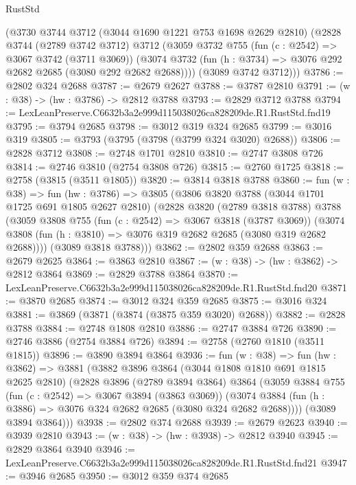 \begin{lexlean}{RustStd}
\begin{coremodule}
    (@3730
      @3744
      @3712
      (@3044 @1690 @1221 @753 @1698 @2629 @2810)
      (@2828
        @3744
        (@2789 @3742 @3712)
        @3712
        (@3059
          @3732
          @755
          (fun (c : @2542) => @3067 @3742 (@3711 @3069))
          (@3074 @3732 (fun (h : @3734) => @3076 @292 @2682 @2685 (@3080 @292 @2682 @2688))))
        (@3089 @3742 @3712)))
@3786 := @2802 @324 @2688
@3787 := @2679 @2627
@3788 := @3787 @2810
@3791 := (w : @38) -> (hw : @3786) -> @2812 @3788
@3793 := @2829 @3712 @3788
@3794 := LexLeanPreserve.C6632b3a2e999d115038026ca828209de.R1.RustStd.fnd19
@3795 := @3794 @2685
@3798 := @3012 @319 @324 @2685
@3799 := @3016 @319
@3805 := @3793 (@3795 (@3798 (@3799 @324 @3020) @2688))
@3806 := @2828 @3712
@3808 := @2748 @1701 @2810
@3810 := @2747 @3808 @726
@3814 := @2746 @3810 (@2754 @3808 @726)
@3815 := @2760 @1725
@3818 := @2758 (@3815 (@3511 @1805))
@3820 := @3814 @3818 @3788
@3860 := fun (w : @38) =>
  fun (hw : @3786) =>
  @3805
    (@3806
      @3820
      @3788
      (@3044 @1701 @1725 @691 @1805 @2627 @2810)
      (@2828
        @3820
        (@2789 @3818 @3788)
        @3788
        (@3059
          @3808
          @755
          (fun (c : @2542) => @3067 @3818 (@3787 @3069))
          (@3074 @3808 (fun (h : @3810) => @3076 @319 @2682 @2685 (@3080 @319 @2682 @2688))))
        (@3089 @3818 @3788)))
@3862 := @2802 @359 @2688
@3863 := @2679 @2625
@3864 := @3863 @2810
@3867 := (w : @38) -> (hw : @3862) -> @2812 @3864
@3869 := @2829 @3788 @3864
@3870 := LexLeanPreserve.C6632b3a2e999d115038026ca828209de.R1.RustStd.fnd20
@3871 := @3870 @2685
@3874 := @3012 @324 @359 @2685
@3875 := @3016 @324
@3881 := @3869 (@3871 (@3874 (@3875 @359 @3020) @2688))
@3882 := @2828 @3788
@3884 := @2748 @1808 @2810
@3886 := @2747 @3884 @726
@3890 := @2746 @3886 (@2754 @3884 @726)
@3894 := @2758 (@2760 @1810 (@3511 @1815))
@3896 := @3890 @3894 @3864
@3936 := fun (w : @38) =>
  fun (hw : @3862) =>
  @3881
    (@3882
      @3896
      @3864
      (@3044 @1808 @1810 @691 @1815 @2625 @2810)
      (@2828
        @3896
        (@2789 @3894 @3864)
        @3864
        (@3059
          @3884
          @755
          (fun (c : @2542) => @3067 @3894 (@3863 @3069))
          (@3074 @3884 (fun (h : @3886) => @3076 @324 @2682 @2685 (@3080 @324 @2682 @2688))))
        (@3089 @3894 @3864)))
@3938 := @2802 @374 @2688
@3939 := @2679 @2623
@3940 := @3939 @2810
@3943 := (w : @38) -> (hw : @3938) -> @2812 @3940
@3945 := @2829 @3864 @3940
@3946 := LexLeanPreserve.C6632b3a2e999d115038026ca828209de.R1.RustStd.fnd21
@3947 := @3946 @2685
@3950 := @3012 @359 @374 @2685

\end{coremodule}
\end{lexlean}
